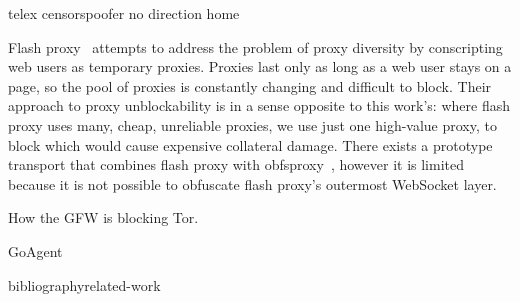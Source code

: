 \documentclass{article}
\begin{document}
telex censorspoofer no direction home

Flash proxy~\cite{flashproxy-pets12} attempts to address the problem of proxy
diversity by conscripting web users as temporary proxies. Proxies last only as
long as a web user stays on a page, so the pool of proxies is constantly
changing and difficult to block. Their approach to proxy unblockability is in a
sense opposite to this work's: where flash proxy uses many, cheap, unreliable
proxies, we use just one high-value proxy, to block which would cause expensive
collateral damage. There exists a prototype transport that combines flash proxy
with obfsproxy~\cite{obfs-flash}, however it is limited because it is not
possible to obfuscate flash proxy's outermost WebSocket layer.

How the GFW is blocking Tor. \cite{foci12-winter}

GoAgent


 bibliography{related-work}
\end{document}
